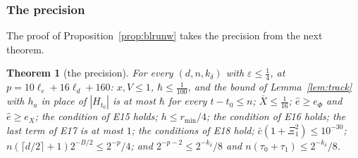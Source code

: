 \documentclass[11pt]{amsart}
\newtheorem{theorem}{Theorem}[section]
\theoremstyle{definition}
\numberwithin{equation}{section}
\begin{document}
\subsubsection{The precision}\label{app:track-bud}

The proof of Proposition~\ref{prop:blrunw} takes the precision from the next theorem.

\begin{theorem}[the precision]\label{thm:bud}
For every $(d,n,k_\delta)$ with $\varepsilon\le\frac14$, at $p=10\ell_e+16\ell_d+160$: $x,V\le1$, $\hbar\le\frac1{100}$, and the bound of Lemma~\ref{lem:track} with $h_a$ in place of $|H_{t_0}|$ is at most $\hbar$ for every $t-t_0\le n$; $\bar X\le\frac1{16}$; $\hat e\ge e_\Phi$ and $\hat e\ge e_X$; the condition of E15 holds; $h\le r_{\min}/4$; the condition of E16 holds; the last term of E17 is at most $1$; the conditions of E18 hold; $\bar c(1+\Xi_1^2)\le10^{-30}$; $n(\lceil d/2\rceil+1)2^{-B/2}\le2^{-p}/4$; and $2^{-p-2}\le2^{-k_\delta}/8$ and $n(\tau_0+\tau_1)\le2^{-k_\delta}/8$.
\end{theorem}
\end{document}

